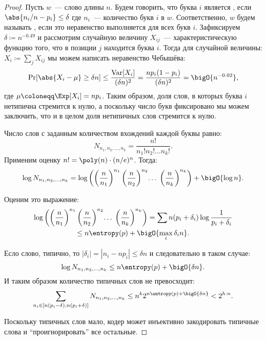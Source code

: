 \begin{proof}
    Пусть $w$~--- слово длины $n$. Будем говорить, что буква $i$ является ,
    если $\abs{n_i / n - p_i} \le \delta$ где $n_i$~--- количество букв $i$ в $w$. Соответственно, $w$
    будем называть , если это неравенство выполняется для всех букв
    $i$. Зафиксируем $\delta \coloneqq n^{-0.49}$ и рассмотрим случайную величину $X_{ij}$~---
    характеристическую функцию того, что в позиции $j$ находится буква $i$. Тогда для случайной величины:
    $X_i \coloneqq \sum\limits_j X_{ij}$ мы можем написать неравенство Чебышёва:
    $$
        \Pr[\abs{X_i - \mu} \ge \delta n] \le \frac{\operatorname{Var}[X_i]}{(\delta n)^2} =
        \frac{n p_i (1 - p_i)}{(\delta n)^2} = \bigO{n^{-0.02}},
    $$
    где $\mu \coloneqq \Exp[X_i] = np_i$. Таким образом, доля слов, в которых буква $i$ нетипична
    стремится к нулю, а поскольку число букв фиксировано мы можем заключить, что и в целом доля
    нетипичных слов стремится к нулю. 
    
    Число слов с заданным количеством вхождений каждой буквы равно:
    $$
        N_{n_1, n_2, \dots, n_k} = \frac{n!}{n_1!n_2!\dots n_k!}.
    $$
    Применим оценку $n! = \poly(n) \cdot (n / e)^n$. Тогда:
    $$
        \log{N_{n_1, n_2, \dots, n_k}} =
        \log\left(\left(\frac{n}{n_1}\right)^{n_1} \left(\frac{n}{n_2}\right)^{n_2} \!\ldots\;
          \left(\frac{n}{n_k}\right)^{n_k} \right)
        + \bigO{\log n}.
    $$

    Оценим это выражение:
    \begin{multline*}
        \log\left(\left(\frac{n}{n_1}\right)^{n_1} \left(\frac{n}{n_2}\right)^{n_2}
          \!\ldots\;\left(\frac{n}{n_k}\right)^{n_k} \right)
        = \sum n(p_i + \delta_i) \log\frac{1}{p_i + \delta_i}\\
        \le n \entropy(p) + \bigO{\max\limits_{i} \delta_i n}.
    \end{multline*}
    
    Есло слово, типично, то $|\delta_i| = |n_i - np_i| \le \delta n$ и следовательно в таком случае:
    $$
        \log{N_{n_1, n_2, \dots, n_k}} \le n \entropy(p) + \bigO{\delta n}.
    $$
    И таким образом количество типичных слов не превосходит:
    $$
        \sum\limits_{n_i \in [n (p_i - \delta), n (p_i + \delta)]} N_{n_1, n_2, \dots, n_k} \le n^k 2^{n
            \entropy(p) + \bigO{\delta n}} < 2^{h \cdot n}.
    $$

    Поскольку типичных слов мало, кодер может инъективно закодировать типичные слова и
    ``проигнорировать'' все остальные.


\end{proof}
